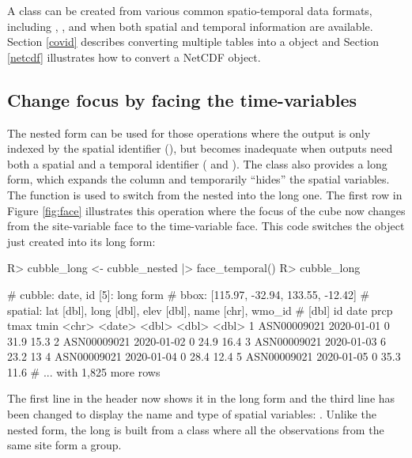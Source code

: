 \documentclass[
  shortnames]{jss}
\begin{document}
A  class can be created from various common spatio-temporal data formats, including , , and  when both spatial and temporal information are available. Section \ref{covid} describes converting multiple tables into a  object and Section \ref{netcdf} illustrates how to convert a NetCDF object.

\hypertarget{change-focus-by-facing-the-time-variables}{%
\subsection{Change focus by facing the time-variables}\label{change-focus-by-facing-the-time-variables}}

The nested form can be used for those operations where the output is only indexed by the spatial identifier (), but becomes inadequate when outputs need both a spatial and a temporal identifier ( and ). The  class also provides a long form, which expands the  column and temporarily ``hides'' the spatial variables. The function  is used to switch from the nested  into the long one. The first row in Figure \ref{fig:face} illustrates this operation where the focus of the cube now changes from the site-variable face to the time-variable face. This code switches the  object just created into its long form:

\begin{CodeChunk}
\begin{CodeInput}
R> cubble_long <- cubble_nested |> face_temporal()
R> cubble_long
\end{CodeInput}
\begin{CodeOutput}
# cubble:  date, id [5]: long form
# bbox:    [115.97, -32.94, 133.55, -12.42]
# spatial: lat [dbl], long [dbl], elev [dbl], name [chr], wmo_id
#   [dbl]
  id          date        prcp  tmax  tmin
  <chr>       <date>     <dbl> <dbl> <dbl>
1 ASN00009021 2020-01-01     0  31.9  15.3
2 ASN00009021 2020-01-02     0  24.9  16.4
3 ASN00009021 2020-01-03     6  23.2  13  
4 ASN00009021 2020-01-04     0  28.4  12.4
5 ASN00009021 2020-01-05     0  35.3  11.6
# ... with 1,825 more rows
\end{CodeOutput}
\end{CodeChunk}

The first line in the header now shows it in the long form and the third line has been changed to display the name and type of spatial variables: . Unlike the nested form, the long  is built from a  class where all the observations from the same site form a group.
\end{document}
